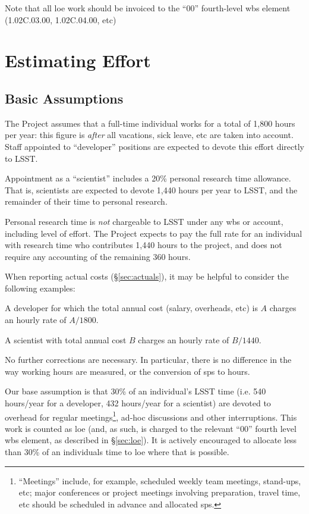 Note that all \gls{loe} work should be invoiced to the ``00'' fourth-level \gls{wbs} element (1.02C.03.00, 1.02C.04.00, etc)

\section{Estimating Effort}
\label{sec:effort}

\subsection{Basic Assumptions}
The Project assumes that a full-time individual works for a total of
1,800 hours per year: this figure is \emph{after} all vacations, sick
leave, etc are taken into account. Staff appointed to ``developer''
positions are expected to devote this effort directly to LSST.

Appointment as a ``scientist'' includes a 20\% personal research time
allowance. That is, scientists are expected to devote 1,440 hours per
year to LSST, and the remainder of their time to personal research.

Personal research time is \emph{not} chargeable to LSST under any \gls{wbs} or
account, including level of effort. The Project expects to pay the full
rate for an individual with research time who contributes 1,440 hours to
the project, and does not require any accounting of the remaining 360
hours.

When reporting actual costs (\S\ref{sec:actuals}), it may
be helpful to consider the following examples:

A developer for which the total annual cost (salary, overheads, etc) is
\(A\) charges an hourly rate of \(A / 1800\).

A scientist with total annual cost \(B\) charges an hourly rate of
\(B / 1440\).

No further corrections are necessary. In particular, there is no
difference in the way working hours are measured, or the conversion of
\glspl{sp} to hours.

Our base assumption is that 30\% of an individual's LSST time (i.e. 540 hours/year for a developer, 432 hours/year for a scientist) are devoted to overhead for regular meetings\footnote{``Meetings'' include, for example, scheduled weekly team meetings, stand-ups, etc; major conferences or project meetings involving preparation, travel time, etc should be scheduled in advance and allocated \glspl{sp}.}, ad-hoc discussions and other interruptions.
This work is counted as \gls{loe} (and, as such, is charged to the relevant ``00'' fourth level \gls{wbs} \gls{element}, as described in \S\ref{sec:loe}).
It is actively encouraged to allocate less than 30\% of an individuals time to \gls{loe} where that is possible.

